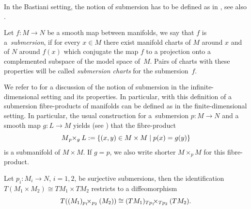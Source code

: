 In the Bastiani setting, the notion of submersion has to be defined as in \cite[Definition 4.4.8]{Ham82}, see also \cite{Sch23}.

\begin{Definition}\label{defn:submersion}
Let $f \colon M \rightarrow N$ be a smooth map between manifolds, we say that $f$ is a~\emph{submersion}, if for every $x \in M$ there exist manifold charts of $M$ around $x$ and of $N$ around $f(x)$ which conjugate the map $f$ to a projection onto a complemented subspace of the model space of~$M$. Pairs of charts with these properties will be called \emph{submersion charts} for the submersion~$f$.
\end{Definition}
We refer to \cite{glo16} for a discussion of the notion of submersion in the infinite-dimensional setting and its properties.
In particular, with this definition of a submersion fibre-products of manifolds can be defined as in the finite-dimensional setting. In particular, the usual construction for a~submersion $p\colon M \rightarrow N$ and a smooth map $g\colon L \rightarrow M$ yields (see \cite[Lemma 1.60]{Sch23}) that the fibre-product
\begin{displaymath}
 M {}_{p}\hspace{-.25em}\times_{g} L := \{(x,y) \in M\times M \mid p(x)=g(y)\}
\end{displaymath}
is a submanifold of $M\times M$. If $g=p$, we also write shorter $M\times_p M$ for this fibre-product.

\begin{Lemma}\label{lem:tangent_fibreprod}
Let $p_i \colon M_i \rightarrow N$, $i=1,2$, be surjective submersions, then the identification $T(M_1\times M_2) \cong TM_1 \times TM_2$ restricts to a diffeomorphism
\begin{displaymath}
 T((M_1) {}_{p_1}\hspace{-.5em}\times_{p_2} (M_2) ) \cong (TM_1) {}_{Tp_1}\hspace{-.5em}\times_{Tp_2} (TM_2).\end{displaymath}
\end{Lemma}

